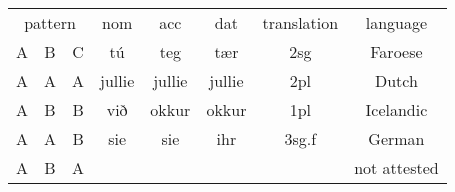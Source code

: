 
\begin{tabular}{cccccccc}
  \toprule
      \multicolumn{3}{c}{pattern}
        & \ac{nom}
        & \ac{acc}
        & \ac{dat}
        & translation
        & language \\
  \cmidrule(lr){1-3} \cmidrule(lr){4-6} \cmidrule(lr){7-7} \cmidrule(lr){8-8}
      A & B & C
        & tú
        & teg
        & tær
        & 2\ac{sg}
        & Faroese \\
      A & A & A
        & \cellcolor{LG}jullie
        & \cellcolor{LG}jullie
        & \cellcolor{LG}jullie
        & 2\ac{pl}
        & Dutch \\
      A & B & B
        & við
        & \cellcolor{LG}okkur
        & \cellcolor{LG}okkur
        & 1\ac{pl}
        & Icelandic \\
      A & A & B
        & \cellcolor{LG}sie
        & \cellcolor{LG}sie
        & ihr
        & 3\ac{sg}.\ac{f}
        & German \\
      A & B & A
        & \cellcolor{LG}
        &
        & \cellcolor{LG}
        &
        & not attested \\
  \bottomrule
\end{tabular}
